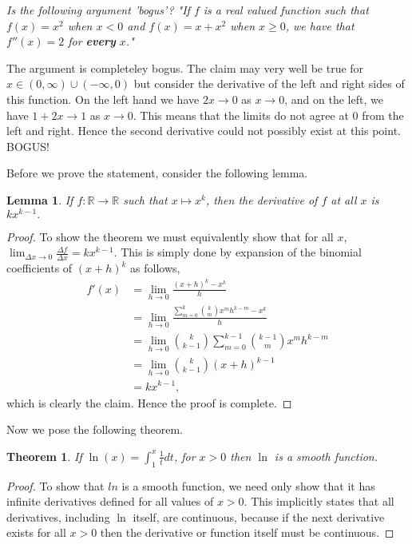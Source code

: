 \documentclass[letter]{article}
\newtheorem{theorem}{Theorem}
\newtheorem{lemma}{Lemma}
\newenvironment{menumerate}{%
  \edef\backupindent{\the\parindent}%
  \enumerate%
  \setlength{\parindent}{\backupindent}%
}{\endenumerate}
\begin{document}
\begin{menumerate}
	


	\setcounter{enumi}{14}
	\item \emph{Is the following argument 'bogus'? "If $f$ is a real valued function such that $f(x) = x^2$ when $x < 0$ and $f(x) = x + x^2$ when $x\geq 0$, we have that $f''(x) = 2$ for \textbf{every} $x$."}

	The argument is completeley bogus. The claim may very well be true for $x \in (0,\infty) \cup (-\infty, 0)$ but consider the derivative of the left and right sides of this function. On the left hand we have $2x \to 0$ as $x \to 0$, and on the left, we have $1 + 2x \to 1$ as $x \to 0$. This means that the limits do not agree at 0 from the left and right. Hence the second derivative could not possibly exist at this point. BOGUS!  

	\item
	\begin{menumerate}
	 \item
	 	Before we prove the statement, consider the following lemma.
	 	\begin{lemma}
	 	 If $f: \mathbb{R} \to \mathbb{R}$ such that $x \mapsto x^k$, then the derivative of $f$ at all $x$ is $kx^{k-1}.$ 
	 	\end{lemma}
	 	\begin{proof}
	 	To show the theorem we must equivalently show that for all $x$, $\lim_{\Delta x \to 0} \frac{\Delta f}{\Delta x} = kx^{k-1}.$ This is simply done by expansion of the binomial coefficients of $(x +h)^k$ as follows,
	 	\begin{equation*}
	 	\begin{aligned}
	 	    f'(x) &= \lim_{h\to 0}\frac{(x+h)^k - x^k}{h} \\
	 	    &=  \lim_{h\to 0}\frac{\sum_{m=0}^k \binom km x^mh^{k-m}  - x^k}{h} \\
	 	    &=  \lim_{h\to 0} \binom k{k-1}{\sum_{m=0}^{k-1} \binom {k-1}m x^mh^{k-m}} \\
	 	    &=  \lim_{h\to 0} \binom k{k-1}(x+h)^{k-1} \\
	 	    &= kx^{k-1},
	 	\end{aligned}
	 	\end{equation*}
	 	which is clearly the claim. Hence the proof is complete.
	 	\end{proof}

	 	Now we pose the following theorem. 
	 	\begin{theorem}
	 		If $\ln(x) = \int_1^x \frac{1}{t} dt$, for $x>0$ then $\ln$ is a smooth function.
	 	\end{theorem}
	 	\begin{proof}
	 	To show that $ln$ is a smooth function, we need only show that it has infinite derivatives defined for all values of $x >0.$ This implicitly states that all derivatives, including $\ln$ itself, are continuous, because if the next derivative exists for all $x > 0$ then the derivative or function itself must be continuous.


\end{proof}
\end{menumerate}
\end{menumerate}
\end{document}
